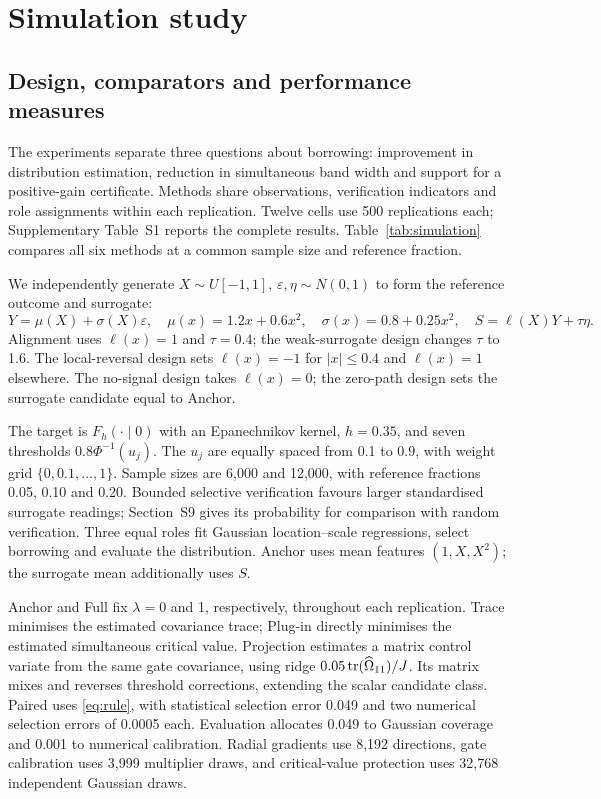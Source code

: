 \section{Simulation study}
\label{sec:simulation}
\subsection{Design, comparators and performance measures}
The experiments separate three questions about borrowing: improvement in distribution estimation, reduction in simultaneous band width and support for a positive-gain certificate.
Methods share observations, verification indicators and role assignments within each replication.
Twelve cells use 500 replications each; Supplementary Table~S1 reports the complete results.
Table~\ref{tab:simulation} compares all six methods at a common sample size and reference fraction.

We independently generate $X\sim U[-1,1]$, $\varepsilon,\eta\sim N(0,1)$ to form the reference outcome and surrogate:
\[
 Y=\mu(X)+\sigma(X)\varepsilon,\quad
 \mu(x)=1.2x+0.6x^2,\quad \sigma(x)=0.8+0.25x^2,\quad
 S=\ell(X)Y+\tau\eta.
\]
Alignment uses $\ell(x)=1$ and $\tau=0.4$; the weak-surrogate design changes $\tau$ to 1.6.
The local-reversal design sets $\ell(x)=-1$ for $|x|\leq0.4$ and $\ell(x)=1$ elsewhere.
The no-signal design takes $\ell(x)=0$; the zero-path design sets the surrogate candidate equal to Anchor.

The target is $F_h(\cdot\mid0)$ with an Epanechnikov kernel, $h=0.35$, and seven thresholds $0.8\Phi^{-1}(u_j)$.
The $u_j$ are equally spaced from 0.1 to 0.9, with weight grid $\{0,0.1,\ldots,1\}$.
Sample sizes are 6,000 and 12,000, with reference fractions 0.05, 0.10 and 0.20.
Bounded selective verification favours larger standardised surrogate readings; Section~S9 gives its probability for comparison with random verification.
Three equal roles fit Gaussian location--scale regressions, select borrowing and evaluate the distribution.
Anchor uses mean features $(1,X,X^2)$; the surrogate mean additionally uses $S$.

Anchor and Full fix $\lambda=0$ and 1, respectively, throughout each replication.
Trace minimises the estimated covariance trace; Plug-in directly minimises the estimated simultaneous critical value.
Projection estimates a matrix control variate from the same gate covariance, using ridge $0.05\operatorname{tr}(\widehat\Omega_{11})/J$.
Its matrix mixes and reverses threshold corrections, extending the scalar candidate class.
Paired uses \eqref{eq:rule}, with statistical selection error 0.049 and two numerical selection errors of 0.0005 each.
Evaluation allocates 0.049 to Gaussian coverage and 0.001 to numerical calibration.
Radial gradients use 8,192 directions, gate calibration uses 3,999 multiplier draws, and critical-value protection uses 32,768 independent Gaussian draws.

